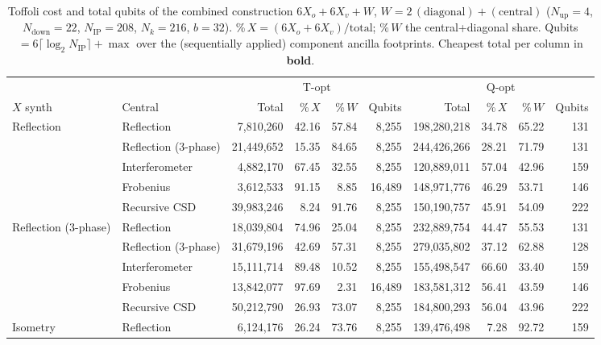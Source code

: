 \begin{table}[htbp]
  \centering
  \caption{Toffoli cost and total qubits of the combined construction
           $6X_o + 6X_v + W$, $W = 2\,(\text{diagonal}) + (\text{central})$
           ($N_\mathrm{up}=4$, $N_\mathrm{down}=22$, $N_\mathrm{IP}=208$, $N_k=216$, $b=32$).
           \%\,$X = (6X_o+6X_v)/\text{total}$; \%\,$W$ the central+diagonal share.
           Qubits $= 6\lceil\log_2 N_\mathrm{IP}\rceil + \max$ over the (sequentially applied)
           component ancilla footprints. Cheapest total per column in \textbf{bold}.}
  \setlength{\tabcolsep}{4pt}
  \begin{tabular}{llrrrrrrrr}
    \toprule
    & & \multicolumn{4}{c}{T-opt} & \multicolumn{4}{c}{Q-opt} \\
    \cmidrule(lr){3-6}\cmidrule(lr){7-10}
    $X$ synth & Central & Total & \%\,$X$ & \%\,$W$ & Qubits & Total & \%\,$X$ & \%\,$W$ & Qubits \\
    \midrule
    Reflection & Reflection & 7{,}810{,}260 & 42.16 & 57.84 & 8{,}255 & 198{,}280{,}218 & 34.78 & 65.22 & 131 \\
     & Reflection (3-phase) & 21{,}449{,}652 & 15.35 & 84.65 & 8{,}255 & 244{,}426{,}266 & 28.21 & 71.79 & 131 \\
     & Interferometer & 4{,}882{,}170 & 67.45 & 32.55 & 8{,}255 & 120{,}889{,}011 & 57.04 & 42.96 & 159 \\
     & Frobenius & 3{,}612{,}533 & 91.15 & 8.85 & 16{,}489 & 148{,}971{,}776 & 46.29 & 53.71 & 146 \\
     & Recursive CSD & 39{,}983{,}246 & 8.24 & 91.76 & 8{,}255 & 150{,}190{,}757 & 45.91 & 54.09 & 222 \\
    \midrule
    Reflection (3-phase) & Reflection & 18{,}039{,}804 & 74.96 & 25.04 & 8{,}255 & 232{,}889{,}754 & 44.47 & 55.53 & 131 \\
     & Reflection (3-phase) & 31{,}679{,}196 & 42.69 & 57.31 & 8{,}255 & 279{,}035{,}802 & 37.12 & 62.88 & 128 \\
     & Interferometer & 15{,}111{,}714 & 89.48 & 10.52 & 8{,}255 & 155{,}498{,}547 & 66.60 & 33.40 & 159 \\
     & Frobenius & 13{,}842{,}077 & 97.69 & 2.31 & 16{,}489 & 183{,}581{,}312 & 56.41 & 43.59 & 146 \\
     & Recursive CSD & 50{,}212{,}790 & 26.93 & 73.07 & 8{,}255 & 184{,}800{,}293 & 56.04 & 43.96 & 222 \\
    \midrule
    Isometry & Reflection & 6{,}124{,}176 & 26.24 & 73.76 & 8{,}255 & 139{,}476{,}498 & 7.28 & 92.72 & 159 \\

\end{tabular}
\end{table}
